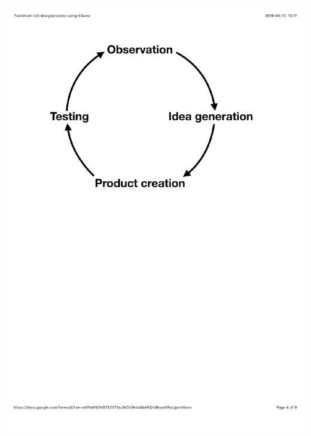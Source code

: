 \documentclass[12pt]{kththesis}
\begin{document}
\begin{appendices}
\includegraphics[width=1\textwidth]{UX_designprocess4.pdf}

\end{appendices}
\end{document}
